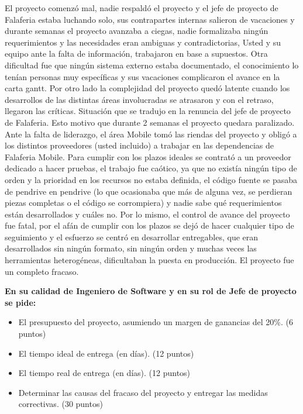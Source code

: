 \documentclass[10pt]{examdesign}
\begin{document}
\begin{shortanswer}[title={Pregunta de desarrollo}, rearrange=yes,resetcounter=yes]
\begin{question}
	\newline
	El proyecto comenzó mal, nadie respaldó el proyecto y el jefe de proyecto de Falaferia estaba luchando solo, sus contrapartes internas salieron de vacaciones y durante semanas el proyecto avanzaba a ciegas, nadie formalizaba ningún requerimientos y las necesidades eran ambiguas y contradictorias, Usted y su equipo ante la falta de información, trabajaron en base a supuestos. Otra dificultad fue que ningún sistema externo estaba documentado, el conocimiento lo tenían personas muy específicas y sus vacaciones complicaron el avance en la carta gantt. Por otro lado la complejidad del proyecto quedó latente cuando los desarrollos de las distintas áreas involucradas se atrasaron y con el retraso, llegaron las críticas. Situación que se tradujo en la renuncia del jefe de proyecto de Falaferia. Esto motivo que durante 2 semanas el proyecto quedara paralizado. Ante la falta de liderazgo, el área Mobile tomó las riendas del proyecto y obligó a los distintos proveedores (usted incluido) a trabajar en las dependencias de Falaferia Mobile. Para cumplir con los plazos ideales se contrató a un proveedor dedicado a hacer pruebas, el trabajo fue caótico, ya que no existía ningún tipo de orden y la prioridad en los recursos no estaba definida, el código fuente se pasaba de pendrive en pendrive (lo que ocasionaba que más de alguna vez, se perdieran piezas completas o el código se corrompiera) y nadie sabe qué requerimientos están desarrollados y cuáles no. Por lo mismo, el control de avance del proyecto fue fatal, por el afán de cumplir con los plazos se dejó de hacer cualquier tipo de seguimiento y el esfuerzo se centró en desarrollar entregables, que eran desarrollados sin ningún formato, sin ningún orden y muchas veces las herramientas heterogéneas, dificultaban la puesta en producción. 
	\newline
	El proyecto fue un completo fracaso.
	{ \bf
	En su calidad de Ingeniero de Software y en su rol de Jefe de proyecto se pide:
	\begin{itemize}
	 \item El presupuesto del proyecto, asumiendo un margen de ganancias del 20\%. (6 puntos)
	 \item El tiempo ideal de entrega (en días). (12 puntos)
	 \item El tiempo real de entrega (en días). (12 puntos) 
	 \item Determinar las causas del fracaso del proyecto y entregar las medidas correctivas. (30 puntos)
	\end{itemize}
	}


\end{question}
\end{shortanswer}
\end{document}
